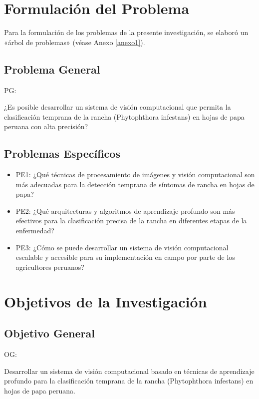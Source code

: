 \section{Formulación del Problema}
Para la formulación de los problemas de la presente investigación, se elaboró un «árbol de problemas» (véase Anexo \ref{anexo1}).

\subsection{Problema General}
PG: \newcommand{\ProblemaGeneral}{
	¿Es posible desarrollar un sistema de visión computacional que permita la clasificación temprana de la rancha (Phytophthora infestans) en hojas de papa peruana con alta precisión?
}
\ProblemaGeneral

\subsection{Problemas Específicos}
\newcommand{\Pbone}{
	¿Qué técnicas de procesamiento de imágenes y visión computacional son más adecuadas para la detección temprana de síntomas de rancha en hojas de papa?
}

\newcommand{\Pbtwo}{
	¿Qué arquitecturas y algoritmos de aprendizaje profundo son más efectivos para la clasificación precisa de la rancha en diferentes etapas de la enfermedad?
}

\newcommand{\Pbthree}{
	¿Cómo se puede desarrollar un sistema de visión computacional escalable y accesible para su implementación en campo por parte de los agricultores peruanos?
}

\begin{itemize}
	\item PE1: {\Pbone}
	\item PE2: {\Pbtwo}
	\item PE3: {\Pbthree}
\end{itemize}

\section{Objetivos de la Investigación}

\subsection{Objetivo General}
OG: \newcommand{\ObjetivoGeneral}{
	Desarrollar un sistema de visión computacional basado en técnicas de aprendizaje profundo para la clasificación temprana de la rancha (Phytophthora infestans) en hojas de papa peruana.
}
\ObjetivoGeneral

